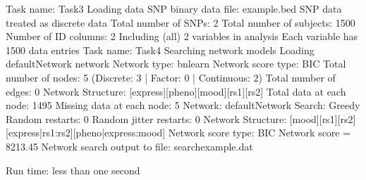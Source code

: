 \documentclass[letterpaper,10pt,english]{sphinxmanual}
\begin{document}
\begin{sphinxVerbatim}[commandchars=\\\{\}]
Task name: Task\PYGZhy{}3
Loading data
SNP binary data file: example.bed
SNP data treated as discrete data
Total number of SNPs: 2
Total number of subjects: 1500
Number of ID columns: 2
Including (all) 2 variables in analysis
Each variable has 1500 data entries
\PYGZhy{}\PYGZhy{}\PYGZhy{}\PYGZhy{}\PYGZhy{}\PYGZhy{}\PYGZhy{}\PYGZhy{}\PYGZhy{}\PYGZhy{}\PYGZhy{}\PYGZhy{}\PYGZhy{}\PYGZhy{}\PYGZhy{}\PYGZhy{}\PYGZhy{}\PYGZhy{}\PYGZhy{}\PYGZhy{}\PYGZhy{}\PYGZhy{}\PYGZhy{}\PYGZhy{}\PYGZhy{}\PYGZhy{}\PYGZhy{}\PYGZhy{}\PYGZhy{}\PYGZhy{}\PYGZhy{}\PYGZhy{}\PYGZhy{}\PYGZhy{}\PYGZhy{}\PYGZhy{}\PYGZhy{}\PYGZhy{}\PYGZhy{}\PYGZhy{}\PYGZhy{}\PYGZhy{}\PYGZhy{}\PYGZhy{}\PYGZhy{}\PYGZhy{}\PYGZhy{}\PYGZhy{}\PYGZhy{}\PYGZhy{}
\PYGZhy{}\PYGZhy{}\PYGZhy{}\PYGZhy{}\PYGZhy{}\PYGZhy{}\PYGZhy{}\PYGZhy{}\PYGZhy{}\PYGZhy{}\PYGZhy{}\PYGZhy{}\PYGZhy{}\PYGZhy{}\PYGZhy{}\PYGZhy{}\PYGZhy{}\PYGZhy{}\PYGZhy{}\PYGZhy{}\PYGZhy{}\PYGZhy{}\PYGZhy{}\PYGZhy{}\PYGZhy{}\PYGZhy{}\PYGZhy{}\PYGZhy{}\PYGZhy{}\PYGZhy{}\PYGZhy{}\PYGZhy{}\PYGZhy{}\PYGZhy{}\PYGZhy{}\PYGZhy{}\PYGZhy{}\PYGZhy{}\PYGZhy{}\PYGZhy{}\PYGZhy{}\PYGZhy{}\PYGZhy{}\PYGZhy{}\PYGZhy{}\PYGZhy{}\PYGZhy{}\PYGZhy{}\PYGZhy{}\PYGZhy{}
Task name: Task\PYGZhy{}4
Searching network models
\PYGZhy{}\PYGZhy{}\PYGZhy{}\PYGZhy{}\PYGZhy{}\PYGZhy{}\PYGZhy{}\PYGZhy{}\PYGZhy{}\PYGZhy{}\PYGZhy{}\PYGZhy{}\PYGZhy{}\PYGZhy{}\PYGZhy{}\PYGZhy{}\PYGZhy{}\PYGZhy{}\PYGZhy{}\PYGZhy{}\PYGZhy{}\PYGZhy{}\PYGZhy{}\PYGZhy{}\PYGZhy{}\PYGZhy{}\PYGZhy{}\PYGZhy{}\PYGZhy{}\PYGZhy{}\PYGZhy{}\PYGZhy{}\PYGZhy{}\PYGZhy{}\PYGZhy{}\PYGZhy{}\PYGZhy{}\PYGZhy{}\PYGZhy{}\PYGZhy{}\PYGZhy{}\PYGZhy{}\PYGZhy{}\PYGZhy{}\PYGZhy{}\PYGZhy{}\PYGZhy{}\PYGZhy{}\PYGZhy{}\PYGZhy{}
Loading defaultNetwork network
Network type: bnlearn
Network score type: BIC
Total number of nodes: 5 (Discrete: 3 | Factor: 0 | Continuous: 2)
Total number of edges: 0
Network Structure: [express][pheno][mood][rs1][rs2]
Total data at each node: 1495
Missing data at each node: 5
\PYGZhy{}\PYGZhy{}\PYGZhy{}\PYGZhy{}\PYGZhy{}\PYGZhy{}\PYGZhy{}\PYGZhy{}\PYGZhy{}\PYGZhy{}\PYGZhy{}\PYGZhy{}\PYGZhy{}\PYGZhy{}\PYGZhy{}\PYGZhy{}\PYGZhy{}\PYGZhy{}\PYGZhy{}\PYGZhy{}\PYGZhy{}\PYGZhy{}\PYGZhy{}\PYGZhy{}\PYGZhy{}\PYGZhy{}\PYGZhy{}\PYGZhy{}\PYGZhy{}\PYGZhy{}\PYGZhy{}\PYGZhy{}\PYGZhy{}\PYGZhy{}\PYGZhy{}\PYGZhy{}\PYGZhy{}\PYGZhy{}\PYGZhy{}\PYGZhy{}\PYGZhy{}\PYGZhy{}\PYGZhy{}\PYGZhy{}\PYGZhy{}\PYGZhy{}\PYGZhy{}\PYGZhy{}\PYGZhy{}\PYGZhy{}
Network: defaultNetwork
Search: Greedy
Random restarts: 0
Random jitter restarts: 0
Network Structure: [mood][rs1][rs2][express|rs1:rs2][pheno|express:mood]
Network score type: BIC
Network score = \PYGZhy{}8213.45
Network search output to file: search\PYGZhy{}example.dat
\PYGZhy{}\PYGZhy{}\PYGZhy{}\PYGZhy{}\PYGZhy{}\PYGZhy{}\PYGZhy{}\PYGZhy{}\PYGZhy{}\PYGZhy{}\PYGZhy{}\PYGZhy{}\PYGZhy{}\PYGZhy{}\PYGZhy{}\PYGZhy{}\PYGZhy{}\PYGZhy{}\PYGZhy{}\PYGZhy{}\PYGZhy{}\PYGZhy{}\PYGZhy{}\PYGZhy{}\PYGZhy{}\PYGZhy{}\PYGZhy{}\PYGZhy{}\PYGZhy{}\PYGZhy{}\PYGZhy{}\PYGZhy{}\PYGZhy{}\PYGZhy{}\PYGZhy{}\PYGZhy{}\PYGZhy{}\PYGZhy{}\PYGZhy{}\PYGZhy{}\PYGZhy{}\PYGZhy{}\PYGZhy{}\PYGZhy{}\PYGZhy{}\PYGZhy{}\PYGZhy{}\PYGZhy{}\PYGZhy{}\PYGZhy{}

Run time: less than one second
\end{sphinxVerbatim}
\end{document}
